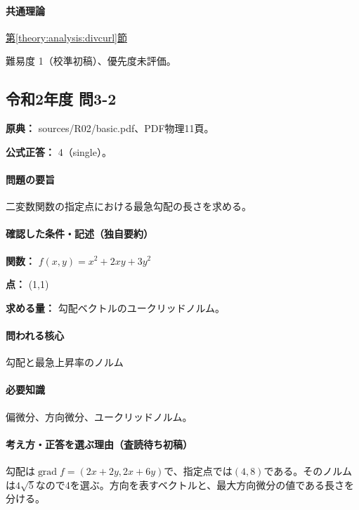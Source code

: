 \paragraph{共通理論} \hyperref[theory:analysis:divcurl]{第\ref*{theory:analysis:divcurl}節}

\par 難易度 1（校準初稿）、優先度未評価。

\subsection{令和2年度 問3-2}
\label{q:r02-reg-basic-3-2}

\noindent\textbf{原典：} sources/R02/basic.pdf、PDF物理11頁。

\textbf{公式正答：} 4（single）。

\paragraph{問題の要旨} 二変数関数の指定点における最急勾配の長さを求める。

\paragraph{確認した条件・記述（独自要約）}\mbox{}\par

\noindent\textbf{関数：} \(f(x,y)=x^2+2xy+3y^2\)\par

\noindent\textbf{点：} (1,1)\par

\noindent\textbf{求める量：} 勾配ベクトルのユークリッドノルム。\par

\paragraph{問われる核心} 勾配と最急上昇率のノルム

\paragraph{必要知識} 偏微分、方向微分、ユークリッドノルム。

\paragraph{考え方・正答を選ぶ理由（査読待ち初稿）} 勾配は\(\operatorname{grad}f=(2x+2y,2x+6y)\)で、指定点では\((4,8)\)である。そのノルムは\(4\sqrt5\)なので4を選ぶ。方向を表すベクトルと、最大方向微分の値である長さを分ける。

